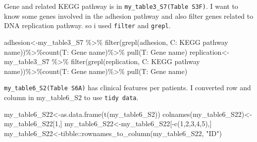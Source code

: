 \documentclass[
]{article}
\newenvironment{Shaded}{\begin{snugshade}}{\end{snugshade}}
\newcommand{\AttributeTok}[1]{\textcolor[rgb]{0.77,0.63,0.00}{#1}}
\newcommand{\DecValTok}[1]{\textcolor[rgb]{0.00,0.00,0.81}{#1}}
\newcommand{\FunctionTok}[1]{\textcolor[rgb]{0.00,0.00,0.00}{#1}}
\newcommand{\NormalTok}[1]{#1}
\newcommand{\OtherTok}[1]{\textcolor[rgb]{0.56,0.35,0.01}{#1}}
\newcommand{\SpecialCharTok}[1]{\textcolor[rgb]{0.00,0.00,0.00}{#1}}
\newcommand{\StringTok}[1]{\textcolor[rgb]{0.31,0.60,0.02}{#1}}
\begin{document}
Gene and related KEGG pathway is in \texttt{my\_table3\_S7(Table\ S3F)}.
I want to know some genes involved in the adhesion pathway and also
filter genes related to DNA replication pathway. so i used
\texttt{filter} and \texttt{grepl}.

\begin{Shaded}
\begin{Highlighting}[]
\NormalTok{adhesion}\OtherTok{\textless{}{-}}\NormalTok{my\_table3\_S7 }\SpecialCharTok{\%\textgreater{}\%} \FunctionTok{filter}\NormalTok{(}\FunctionTok{grepl}\NormalTok{(}\StringTok{\textquotesingle{}adhesion\textquotesingle{}}\NormalTok{, }\StringTok{\textasciigrave{}}\AttributeTok{C: KEGG pathway name}\StringTok{\textasciigrave{}}\NormalTok{))}\SpecialCharTok{\%\textgreater{}\%}\FunctionTok{count}\NormalTok{(}\StringTok{\textasciigrave{}}\AttributeTok{T: Gene name}\StringTok{\textasciigrave{}}\NormalTok{)}\SpecialCharTok{\%\textgreater{}\%} \FunctionTok{pull}\NormalTok{(}\StringTok{\textasciigrave{}}\AttributeTok{T: Gene name}\StringTok{\textasciigrave{}}\NormalTok{)}
\NormalTok{replication}\OtherTok{\textless{}{-}}\NormalTok{my\_table3\_S7 }\SpecialCharTok{\%\textgreater{}\%} \FunctionTok{filter}\NormalTok{(}\FunctionTok{grepl}\NormalTok{(}\StringTok{\textquotesingle{}replication\textquotesingle{}}\NormalTok{, }\StringTok{\textasciigrave{}}\AttributeTok{C: KEGG pathway name}\StringTok{\textasciigrave{}}\NormalTok{))}\SpecialCharTok{\%\textgreater{}\%}\FunctionTok{count}\NormalTok{(}\StringTok{\textasciigrave{}}\AttributeTok{T: Gene name}\StringTok{\textasciigrave{}}\NormalTok{)}\SpecialCharTok{\%\textgreater{}\%} \FunctionTok{pull}\NormalTok{(}\StringTok{\textasciigrave{}}\AttributeTok{T: Gene name}\StringTok{\textasciigrave{}}\NormalTok{)}
\end{Highlighting}
\end{Shaded}

\texttt{my\_table6\_S2(Table\ S6A)} has clinical features per patients.
I converted row and column in my\_table6\_S2 to use \texttt{tidy\ data}.

\begin{Shaded}
\begin{Highlighting}[]
\NormalTok{my\_table6\_S22}\OtherTok{\textless{}{-}}\FunctionTok{as.data.frame}\NormalTok{(}\FunctionTok{t}\NormalTok{(my\_table6\_S2))}
\FunctionTok{colnames}\NormalTok{(my\_table6\_S22)}\OtherTok{\textless{}{-}}\NormalTok{my\_table6\_S22[}\DecValTok{1}\NormalTok{,]}
\NormalTok{my\_table6\_S22}\OtherTok{\textless{}{-}}\NormalTok{my\_table6\_S22[}\SpecialCharTok{{-}}\FunctionTok{c}\NormalTok{(}\DecValTok{1}\NormalTok{,}\DecValTok{2}\NormalTok{,}\DecValTok{3}\NormalTok{,}\DecValTok{4}\NormalTok{,}\DecValTok{5}\NormalTok{),]}
\NormalTok{my\_table6\_S22}\OtherTok{\textless{}{-}}\NormalTok{tibble}\SpecialCharTok{::}\FunctionTok{rownames\_to\_column}\NormalTok{(my\_table6\_S22, }\StringTok{"ID"}\NormalTok{)}
\end{Highlighting}
\end{Shaded}
\end{document}
